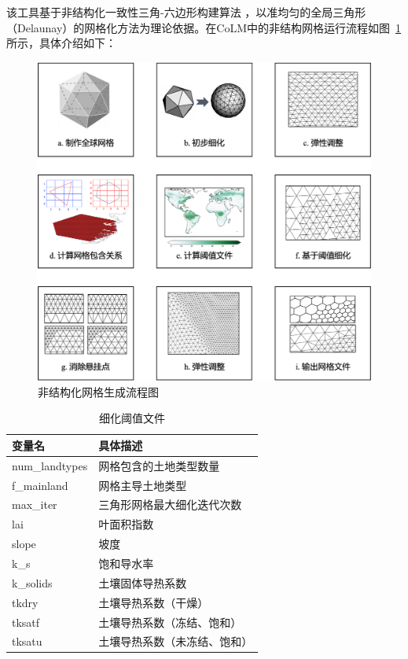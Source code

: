 该工具基于非结构化一致性三角-六边形构建算法 \citep{fatichi2020soil,walko2008ocean,walko_direct_2011}，以准均匀的全局三角形（Delaunay）的网格化方法为理论依据。在CoLM中的非结构网格运行流程如图~\ref{fig:非结构化网格生成流程图} 所示，具体介绍如下：
{
\begin{figure}[htbp]
\centering
\includegraphics[width=\textwidth]{Figures/模式构架/非结构化网格生成流程图.png}
\caption{非结构化网格生成流程图}
\label{fig:非结构化网格生成流程图}
\end{figure}
}

{
\begin{table}[htbp]
\centering
\caption{细化阈值文件}
\label{tab:细化阈值文件}
\begin{tabular}{@{}ll@{}}
\toprule
变量名            & 具体描述           \\\midrule
num\_landtypes & 网格包含的土地类型数量    \\
f\_mainland    & 网格主导土地类型       \\
max\_iter      & 三角形网格最大细化迭代次数  \\
lai            & 叶面积指数          \\
slope          & 坡度             \\
k\_s           & 饱和导水率          \\
k\_solids      & 土壤固体导热系数       \\
tkdry          & 土壤导热系数（干燥）     \\
tksatf         & 土壤导热系数（冻结、饱和）  \\
tksatu         & 土壤导热系数（未冻结、饱和） \\\bottomrule
\end{tabular}
\end{table}
}

